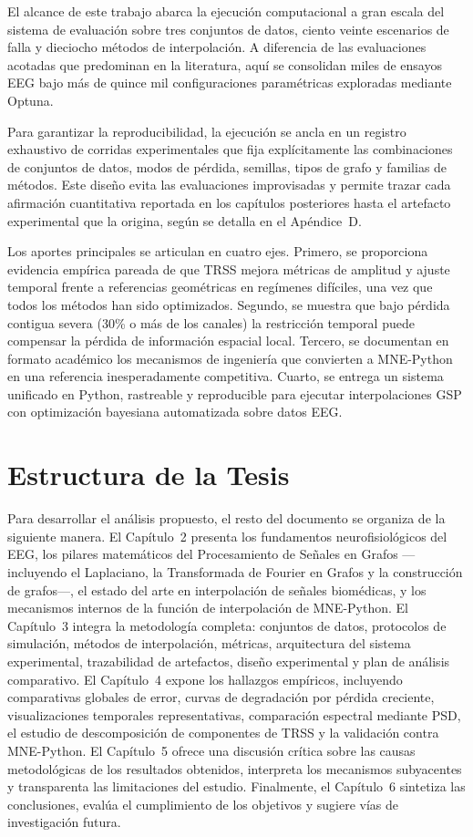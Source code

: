 El alcance de este trabajo abarca la ejecución computacional a gran escala del sistema de evaluación sobre tres conjuntos de datos, ciento veinte escenarios de falla y dieciocho métodos de interpolación. A diferencia de las evaluaciones acotadas que predominan en la literatura, aquí se consolidan miles de ensayos EEG bajo más de quince mil configuraciones paramétricas exploradas mediante Optuna.

Para garantizar la reproducibilidad, la ejecución se ancla en un registro exhaustivo de corridas experimentales que fija explícitamente las combinaciones de conjuntos de datos, modos de pérdida, semillas, tipos de grafo y familias de métodos. Este diseño evita las evaluaciones improvisadas y permite trazar cada afirmación cuantitativa reportada en los capítulos posteriores hasta el artefacto experimental que la origina, según se detalla en el Apéndice~D.

Los aportes principales se articulan en cuatro ejes. Primero, se proporciona evidencia empírica pareada de que TRSS mejora métricas de amplitud y ajuste temporal frente a referencias geométricas en regímenes difíciles, una vez que todos los métodos han sido optimizados. Segundo, se muestra que bajo pérdida contigua severa (30\% o más de los canales) la restricción temporal puede compensar la pérdida de información espacial local. Tercero, se documentan en formato académico los mecanismos de ingeniería que convierten a MNE-Python en una referencia inesperadamente competitiva. Cuarto, se entrega un sistema unificado en Python, rastreable y reproducible para ejecutar interpolaciones GSP con optimización bayesiana automatizada sobre datos EEG.

\section{Estructura de la Tesis}

Para desarrollar el análisis propuesto, el resto del documento se organiza de la siguiente manera. El Capítulo~2 presenta los fundamentos neurofisiológicos del EEG, los pilares matemáticos del Procesamiento de Señales en Grafos —incluyendo el Laplaciano, la Transformada de Fourier en Grafos y la construcción de grafos—, el estado del arte en interpolación de señales biomédicas, y los mecanismos internos de la función de interpolación de MNE-Python. El Capítulo~3 integra la metodología completa: conjuntos de datos, protocolos de simulación, métodos de interpolación, métricas, arquitectura del sistema experimental, trazabilidad de artefactos, diseño experimental y plan de análisis comparativo. El Capítulo~4 expone los hallazgos empíricos, incluyendo comparativas globales de error, curvas de degradación por pérdida creciente, visualizaciones temporales representativas, comparación espectral mediante PSD, el estudio de descomposición de componentes de TRSS y la validación contra MNE-Python. El Capítulo~5 ofrece una discusión crítica sobre las causas metodológicas de los resultados obtenidos, interpreta los mecanismos subyacentes y transparenta las limitaciones del estudio. Finalmente, el Capítulo~6 sintetiza las conclusiones, evalúa el cumplimiento de los objetivos y sugiere vías de investigación futura.

